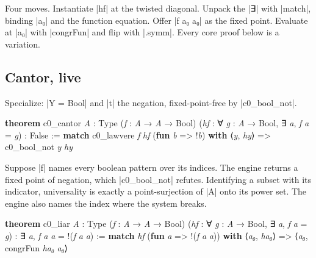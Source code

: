 \documentclass{memoir}
\begin{document}
Four moves. Instantiate \LeanVerb|hf| at the twisted diagonal. Unpack the \LeanVerb|∃| with
\LeanVerb|match|, binding \LeanVerb|a₀| and the function equation. Offer \LeanVerb|f a₀ a₀| as the fixed
point. Evaluate at \LeanVerb|a₀| with \LeanVerb|congrFun| and flip with \LeanVerb|.symm|. Every core proof
below is a variation.



\subsection{Cantor, live}\label{Two--Schemas--of--Impossibility-005F-005F-005F--Machine--Checked--Limits--of--Trustworthy--Machine--Learning-005F-005F-005F--and--Why--They--Tighten--with--Capability----Preliminaries----How--to--read--the--Lean--4----Cantor-005F-005F-005F--live}

Specialize: \LeanVerb|Y = Bool| and \LeanVerb|t| the negation, fixed-point-free by \LeanVerb|c0_bool_not|.

\begin{LeanVerbatim}
\textbf{theorem} c0_cantor \textit{A} : Type (\textit{f} : \textit{A} → \textit{A} → Bool)
    (\textit{hf} : ∀ \textit{g} : \textit{A} → Bool, ∃ \textit{a}, \textit{f} \textit{a} = \textit{g}) : False :=
  \textbf{match} c0_lawvere \textit{f} \textit{hf} (\textbf{fun} \textit{b} => !\textit{b}) \textbf{with}
   ⟨\textit{y}, \textit{hy}⟩ => c0_bool_not \textit{y} \textit{hy}

\end{LeanVerbatim}


Suppose \LeanVerb|f| names every boolean pattern over its indices. The engine returns a
fixed point of negation, which \LeanVerb|c0_bool_not| refutes. Identifying a subset with
its indicator, universality is exactly a point-surjection of \LeanVerb|A| onto its power
set. The engine also names the index where the system breaks.

\begin{LeanVerbatim}
\textbf{theorem} c0_liar \textit{A} : Type (\textit{f} : \textit{A} → \textit{A} → Bool)
    (\textit{hf} : ∀ \textit{g} : \textit{A} → Bool, ∃ \textit{a}, \textit{f} \textit{a} = \textit{g}) :
    ∃ \textit{a}, \textit{f} \textit{a} \textit{a} = !(\textit{f} \textit{a} \textit{a}) :=
  \textbf{match} \textit{hf} (\textbf{fun} \textit{a} => !(\textit{f} \textit{a} \textit{a})) \textbf{with}
   ⟨\textit{a₀}, \textit{ha₀}⟩ => ⟨\textit{a₀}, congrFun \textit{ha₀} \textit{a₀}⟩

\end{LeanVerbatim}
\end{document}
